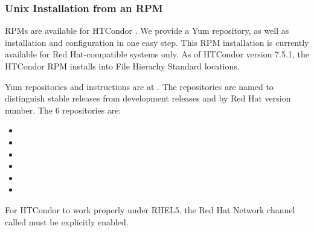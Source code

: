\subsubsection{\label{sec:install-rpms}
Unix Installation from an RPM}

RPMs are available for HTCondor \VersionNotice.
We provide a Yum repository, as well as 
installation and configuration in one easy step.
This RPM installation is currently available for Red Hat-compatible
systems only.
As of HTCondor version 7.5.1, 
the HTCondor RPM installs into File Hierachy Standard locations.

Yum repositories and instructions are at
  .
The repositories are named to distinguish stable releases from
development releases and by Red Hat version number. 
The 6 repositories are:
\begin{itemize}
  \item {}
  \item {}
  \item {}
  \item {}
  \item {}
  \item {}
\end{itemize}

For HTCondor to work properly under RHEL5, 
the Red Hat Network channel called  
must be explicitly enabled.

